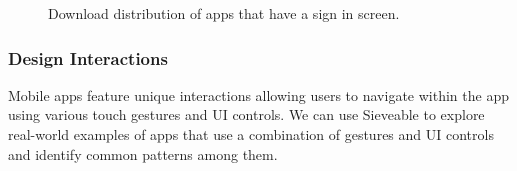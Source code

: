 \begin{figure}[ht]
\centering
{}%
\qquad
{}%
\caption{Download distribution of apps that have a sign in screen.}%
\label{fig:fig_signInDownloadDist}
\end{figure}

\subsubsection{Design Interactions}
Mobile apps feature unique interactions allowing users to navigate within the app using various touch gestures and UI controls. We can use Sieveable to explore real-world examples of apps that use a combination of gestures and UI controls and identify common patterns among them.
	
